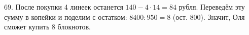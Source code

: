 69. После покупки 4 линеек останется $140-4\cdot14=84$ рубля. Переведём эту сумму в копейки и поделим с остатком: $8400:950=8$ (ост. 800). Значит, Оля сможет купить 8 блокнотов.\\
